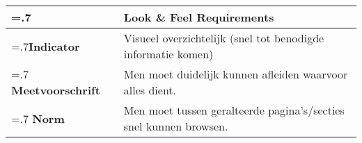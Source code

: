 \noindent
\begin{longtable}{|>{\raggedleft\hsize=.7\hsize\bfseries}X|
    >{\arraybackslash\hsize=1.3\hsize}X|} \hline
\multicolumn{1}{|l|}{\textbf{NFR}} & Look \& Feel Requirements\\ \hline
Indicator & Visueel overzichtelijk (snel tot benodigde informatie komen) \\  \hline
Meetvoorschrift & Men moet duidelijk kunnen afleiden waarvoor alles dient.\\ \hline
Norm & Men moet tussen geralteerde pagina's/secties snel kunnen browsen.\\ \hline
\end{longtable}